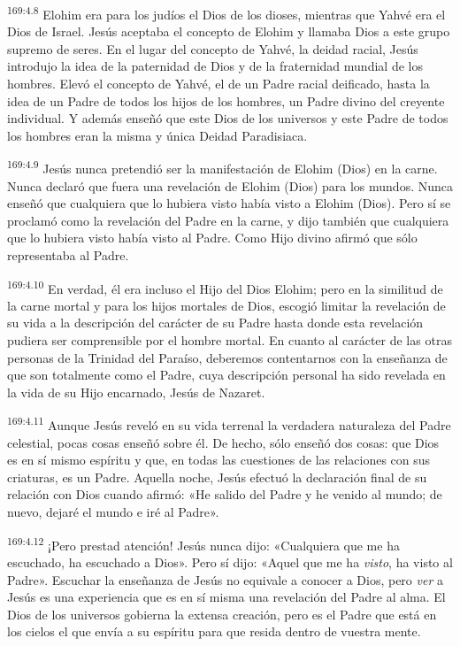 \par 
\textsuperscript{169:4.8} Elohim era para los judíos el Dios de los dioses, mientras que Yahvé era el Dios de Israel. Jesús aceptaba el concepto de Elohim y llamaba Dios a este grupo supremo de seres. En el lugar del concepto de Yahvé, la deidad racial, Jesús introdujo la idea de la paternidad de Dios y de la fraternidad mundial de los hombres. Elevó el concepto de Yahvé, el de un Padre racial deificado, hasta la idea de un Padre de todos los hijos de los hombres, un Padre divino del creyente individual. Y además enseñó que este Dios de los universos y este Padre de todos los hombres eran la misma y única Deidad Paradisiaca.

\par 
\textsuperscript{169:4.9} Jesús nunca pretendió ser la manifestación de Elohim (Dios) en la carne. Nunca declaró que fuera una revelación de Elohim (Dios) para los mundos. Nunca enseñó que cualquiera que lo hubiera visto había visto a Elohim (Dios). Pero sí se proclamó como la revelación del Padre en la carne, y dijo también que cualquiera que lo hubiera visto había visto al Padre. Como Hijo divino afirmó que sólo representaba al Padre.

\par 
\textsuperscript{169:4.10} En verdad, él era incluso el Hijo del Dios Elohim; pero en la similitud de la carne mortal y para los hijos mortales de Dios, escogió limitar la revelación de su vida a la descripción del carácter de su Padre hasta donde esta revelación pudiera ser comprensible por el hombre mortal. En cuanto al carácter de las otras personas de la Trinidad del Paraíso, deberemos contentarnos con la enseñanza de que son totalmente como el Padre, cuya descripción personal ha sido revelada en la vida de su Hijo encarnado, Jesús de Nazaret.

\par 
\textsuperscript{169:4.11} Aunque Jesús reveló en su vida terrenal la verdadera naturaleza del Padre celestial, pocas cosas enseñó sobre él. De hecho, sólo enseñó dos cosas: que Dios es en sí mismo espíritu y que, en todas las cuestiones de las relaciones con sus criaturas, es un Padre. Aquella noche, Jesús efectuó la declaración final de su relación con Dios cuando afirmó: «He salido del Padre y he venido al mundo; de nuevo, dejaré el mundo e iré al Padre».

\par 
\textsuperscript{169:4.12} ¡Pero prestad atención! Jesús nunca dijo: «Cualquiera que me ha escuchado, ha escuchado a Dios». Pero sí dijo: «Aquel que me ha \textit{visto}, ha visto al Padre». Escuchar la enseñanza de Jesús no equivale a conocer a Dios, pero \textit{ver} a Jesús es una experiencia que es en sí misma una revelación del Padre al alma. El Dios de los universos gobierna la extensa creación, pero es el Padre que está en los cielos el que envía a su espíritu para que resida dentro de vuestra mente.

